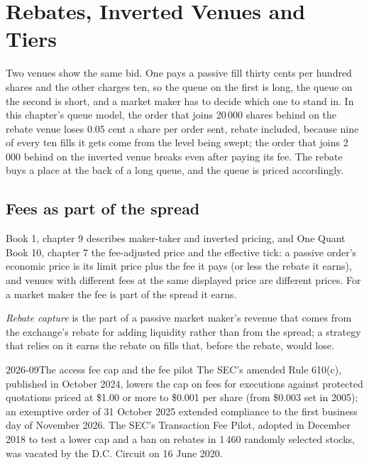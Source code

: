 \chapter{Rebates, Inverted Venues and Tiers}\label{ch:hf:rebates-inverted-venues-and-tiers}

Two venues show the same bid. One pays a passive fill thirty cents per hundred shares and the other charges ten, so the queue on the first is long,
the queue on the second is short, and a market maker has to decide which one to stand in. In this chapter's queue model, the order that joins
20\,000 shares behind on the rebate venue loses 0.05 cent a share per order sent, rebate included, because nine of every ten fills it gets come
from the level being swept; the order that joins 2\,000 behind on the inverted venue breaks even after paying its fee. The rebate buys a place at
the back of a long queue, and the queue is priced accordingly.

\section{Fees as part of the spread}

Book 1, chapter 9 describes maker-taker and inverted pricing, and One Quant Book 10, chapter 7 the fee-adjusted price and the effective tick: a
passive order's economic price is its limit price plus the fee it pays (or less the rebate it earns), and venues with different fees at the same
displayed price are different prices. For a market maker the fee is part of the spread it earns.

\begin{definition}\label{def:hf:rebates-inverted-venues-and-tiers:capture}
\emph{Rebate capture} is the part of a passive market maker's revenue that comes from the exchange's rebate for adding
liquidity rather than from the spread; a strategy that relies on it earns the rebate on fills that, before the rebate, would lose.
\end{definition}

\begin{dated}{2026-09}{The access fee cap and the fee pilot}\label{dat:hf:rebates-inverted-venues-and-tiers:cap}
The SEC's amended Rule 610(c), published in October 2024, lowers the cap on fees for executions against protected quotations priced at \$1.00 or
more to \$0.001 per share (from \$0.003 set in 2005); an exemptive order of 31 October 2025 extended compliance to the first business day of November
2026. The SEC's Transaction Fee Pilot, adopted in December 2018 to test a lower cap and a ban on rebates in 1\,460 randomly selected stocks, was
vacated by the D.C. Circuit on 16 June 2020.
\end{dated}

